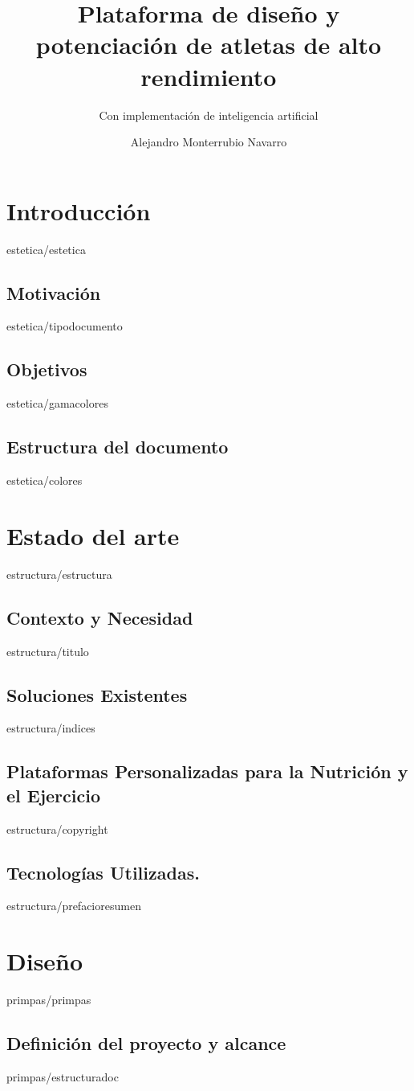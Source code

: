 \documentclass[epsbased,copyright,final,printable,covers,extendedindex,firstnumbered,tfg,gnuplot]{tfgtfmthesisuam}
\title{Plataforma de diseño y potenciación de atletas de alto rendimiento}
\subtitle{Con implementación de inteligencia artificial}
\author{Alejandro Monterrubio Navarro}
\begin{document}
\chapter{Introducción\label{CAP:ESTETICA}}{estetica/estetica}
  \section{Motivación\label{SEC:TIPODOC}}{estetica/tipodocumento}
  \section{Objetivos\label{SEC:GAMASEL}}{estetica/gamacolores}
  \section{Estructura del documento\label{SEC:COLORES}}{estetica/colores}

\chapter{Estado del arte\label{CAP:ESTRUCTURA}}{estructura/estructura}
  \section{Contexto y Necesidad\label{SEC:VARIABLES}}{estructura/titulo}
  \section{Soluciones Existentes\label{SEC:INDICES}}{estructura/indices}
  \section{Plataformas Personalizadas para la Nutrición y el Ejercicio\label{SEC:COPYRIGHT}}{estructura/copyright}
  \section{Tecnologías Utilizadas.\label{SEC:PREFACIO}}{estructura/prefacioresumen}

\chapter{Diseño\label{CAP:PRIMEROSPASOS}}{primpas/primpas}
  \section{Definición del proyecto y alcance\label{SEC:ESTRUCTURAR}}{primpas/estructuradoc}
\end{document}
